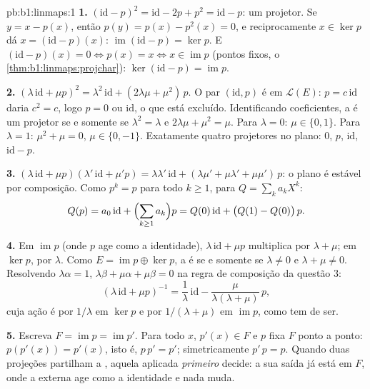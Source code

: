 \begin{solution}{pb:b1:linmaps:1}
\textbf{1.} $(\mathrm{id} - p)^2 = \mathrm{id} - 2p + p^2 =
\mathrm{id} - p$: um projetor. Se $y = x - p(x)$, então $p(y) =
p(x) - p^2(x) = 0$, e
reciprocamente $x \in \ker p$ dá $x =
(\mathrm{id} - p)(x)$: $\operatorname{im}(\mathrm{id} - p) = \ker
p$. E $(\mathrm{id} - p)(x) = 0 \iff p(x) = x \iff x \in
\operatorname{im} p$ (pontos fixos,
o \cref{thm:b1:linmaps:projchar}): $\ker(\mathrm{id} - p) =
\operatorname{im} p$.

\textbf{2.} $(\lambda\,\mathrm{id} + \mu p)^2 =
\lambda^2\,\mathrm{id} + (2\lambda\mu + \mu^2)\,p$. O par $(\mathrm{id}, p)$ é  em $\mathcal{L}(E)$: $p = c\,
\mathrm{id}$ daria
$c^2 = c$, logo $p = 0$ ou $\mathrm{id}$, o que está excluído.
Identificando coeficientes, a  é um projetor se e somente
se $\lambda^2 = \lambda$ e $2\lambda\mu + \mu^2 = \mu$. Para $\lambda = 0$: $\mu \in \{0, 1\}$. Para $\lambda = 1$: $\mu^2 +
\mu = 0$, $\mu \in \{0, -1\}$.
Exatamente quatro projetores no plano: $0$, $p$, $\mathrm{id}$, $\mathrm{id} - p$.

\textbf{3.} $(\lambda\,\mathrm{id} + \mu p)(\lambda'\,\mathrm{id}
+ \mu' p) = \lambda\lambda'\,\mathrm{id} + (\lambda\mu' +
\mu\lambda' + \mu\mu')\,p$: o plano é estável por composição. Como $p^k = p$
para todo $k \geq 1$, para $Q =
\sum_k a_k X^k$:
\[
Q(p) = a_0\,\mathrm{id} + \Bigl(\sum_{k \geq 1} a_k\Bigr) p
= Q(0)\,\mathrm{id} + \bigl(Q(1) - Q(0)\bigr)\,p .
\]

\textbf{4.} Em $\operatorname{im} p$ (onde $p$ age como a identidade), $\lambda\,\mathrm{id} + \mu p$
multiplica por $\lambda
+ \mu$; em $\ker p$, por $\lambda$. Como $E = \operatorname{im} p
\oplus \ker p$, a
 é  se e somente se $\lambda \neq 0$ e $\lambda + \mu \neq 0$. Resolvendo
$\lambda\alpha = 1$, $\lambda\beta + \mu\alpha + \mu\beta = 0$ na regra de composição da questão 3:
\[
(\lambda\,\mathrm{id} + \mu p)^{-1}
= \frac1\lambda\,\mathrm{id} -
\frac{\mu}{\lambda(\lambda + \mu)}\,p ,
\]
cuja ação é por $1/\lambda$ em $\ker p$ e por $1/(\lambda +
\mu)$ em $\operatorname{im} p$, como tem de
ser.

\textbf{5.} Escreva $F = \operatorname{im} p = \operatorname{im}
p'$. Para todo $x$, $p'(x) \in F$ e $p$ fixa $F$
ponto a ponto: $p(p'(x)) = p'(x)$, isto é, $p\,p' = p'$; simetricamente $p'\,p =
p$. Quando
duas projeções partilham a , aquela aplicada \emph{primeiro}
decide: a sua saída já está em $F$, onde a  externa age
como a identidade e nada muda.


\end{solution}

